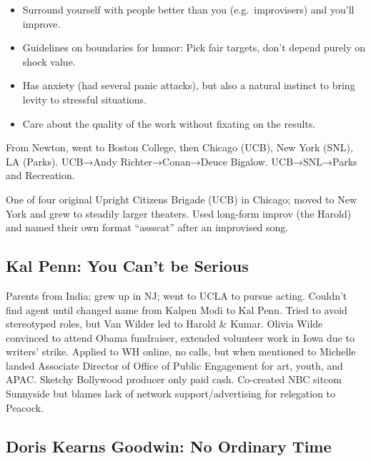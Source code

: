 \documentclass[
]{article}
\begin{document}
\begin{itemize}
\item
  Surround yourself with people better than you (e.g.~improvisers) and
  you'll improve.
\item
  Guidelines on boundaries for humor: Pick fair targets, don't depend
  purely on shock value.
\item
  Has anxiety (had several panic attacks), but also a natural instinct
  to bring levity to stressful situations.
\item
  Care about the quality of the work without fixating on the results.
\end{itemize}

From Newton, went to Boston College, then Chicago (UCB), New York (SNL),
LA (Parks). UCB→Andy Richter→Conan→Deuce Bigalow. UCB→SNL→Parks and
Recreation.

One of four original Upright Citizens Brigade (UCB) in Chicago; moved to
New York and grew to steadily larger theaters. Used long-form improv
(the Harold) and named their own format ``assscat'' after an improvised
song.

\hypertarget{kal-penn-you-cant-be-serious}{%
\subsection{Kal Penn: You Can't be
Serious}\label{kal-penn-you-cant-be-serious}}

Parents from India; grew up in NJ; went to UCLA to pursue acting.
Couldn't find agent until changed name from Kalpen Modi to Kal Penn.
Tried to avoid stereotyped roles, but Van Wilder led to Harold \& Kumar.
Olivia Wilde convinced to attend Obama fundraiser, extended volunteer
work in Iowa due to writers' strike. Applied to WH online, no calls, but
when mentioned to Michelle landed Associate Director of Office of Public
Engagement for art, youth, and APAC. Sketchy Bollywood producer only
paid cash. Co-created NBC sitcom Sunnyside but blames lack of network
support/advertising for relegation to Peacock.

\hypertarget{doris-kearns-goodwin-no-ordinary-time}{%
\subsection{Doris Kearns Goodwin: No Ordinary
Time}\label{doris-kearns-goodwin-no-ordinary-time}}
\end{document}
